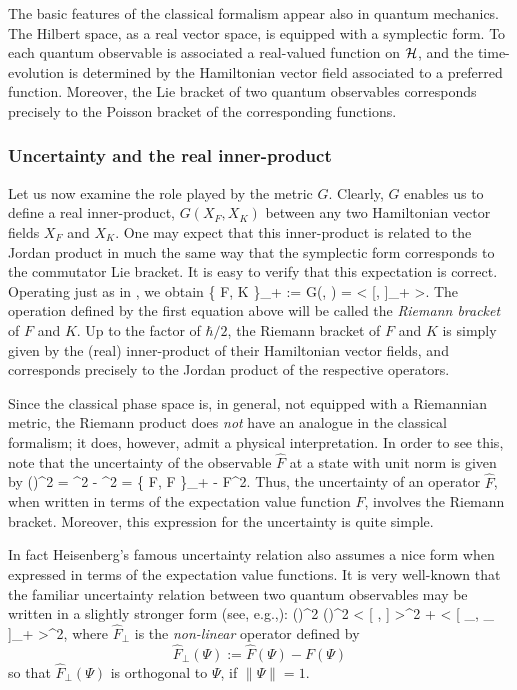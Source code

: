 The basic features of the classical formalism appear also in quantum
mechanics.  The Hilbert space, as a real vector space, is equipped
with a symplectic form.  To each quantum observable is associated a
real-valued function on ${\cal H}$, and the time-evolution is determined by
the Hamiltonian vector field associated to a preferred function.
Moreover, the Lie bracket of two quantum observables corresponds
precisely to the Poisson bracket of the corresponding functions.


\subsubsection{Uncertainty and the real inner-product}

Let us now examine the role played by the metric $G$. Clearly, $G$
enables us to define a real inner-product, $G(X_F, X_K)$ between any
two Hamiltonian vector fields $X_F$ and $X_K$. One may expect that
this inner-product is related to the Jordan product in much the same
way that the symplectic form corresponds to the commutator Lie
bracket. It is easy to verify that this expectation is
correct. Operating just as in , we obtain 
%
\be
\label{symmetric_bracket}
\{ F, K \}_+ :=  G(, )
= \bigg<  [, ]_+ \bigg>.
\ee
%
The operation defined by the first equation above will be called the
{\em Riemann bracket} of $F$ and $K$.  Up to the factor of
$\hbar / 2$, the Riemann bracket of $F$ and $K$ is simply given
by the (real) inner-product of their Hamiltonian vector fields, and
corresponds precisely to the Jordan product of the respective
operators.

Since the classical phase space is, in general, not equipped with a
Riemannian metric, the Riemann product does {\em not} have an analogue
in the classical formalism; it does, however, admit a physical
interpretation.  In order to see this, note that the uncertainty of
the observable $\hat{F}$ at a state with unit norm is given by
%
\be \label{uncertainty}
(\D {})^2 = \< ^2 \> - \<  \>^2
= \{ F, F \}_+ - F^2.
\ee
%
Thus, the uncertainty of an operator $\hat{F}$, when written in terms
of the expectation value function $F$, involves the Riemann bracket.
Moreover, this expression for the uncertainty is quite simple.

In fact Heisenberg's famous uncertainty relation also assumes a nice
form when expressed in terms of the expectation value functions. It is
very well-known that the familiar uncertainty relation between two
quantum observables may be written in a slightly stronger
form (see, e.g.,\cite{shankar}): 
%
\be \label{std_unc_reln}
(\D {})^2 (\D {})^2 \ge
\bigg<  [ ,  ] \bigg>^2
+ \bigg<  [ _{\perp}, 
_{\perp} ]_+ \bigg>^2,
\ee
%
where $\hat{F}_{\perp}$ is the {\em non-linear} operator defined
by
\[
 \hat{F}_{\perp}(\Psi) := \hat{F}(\Psi) - F(\Psi)
\]
so that $\hat{F}_{\perp}(\Psi)$ is orthogonal to $\Psi$,
if $\| \Psi \| = 1$.

